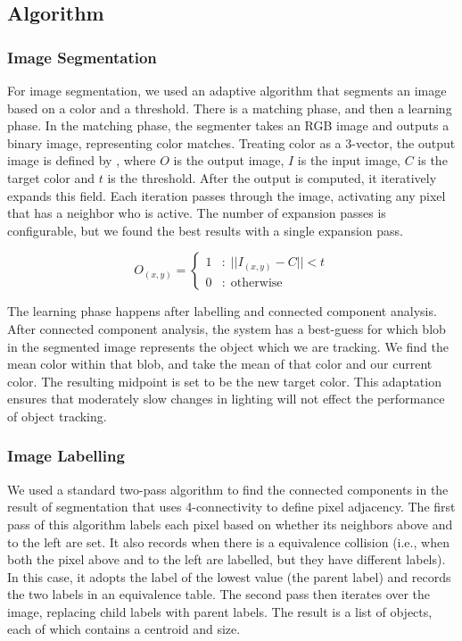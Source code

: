 
\subsection{Algorithm}
\subsubsection{Image Segmentation}
For image segmentation, we used an adaptive algorithm that segments an
image based on a color and a threshold. There is a matching phase, and
then a learning phase. In the matching phase, the segmenter takes an
RGB image and outputs a binary image, representing color
matches. Treating color as a 3-vector, the output image is defined by
, where $O$ is the output image, $I$ is the input
image, $C$ is the target color and $t$ is the threshold. After the
output is computed, it iteratively expands this field. Each iteration
passes through the image, activating any pixel that has a neighbor who
is active. The number of expansion passes is configurable, but we
found the best results with a single expansion pass.

\begin{equation}
  \label{eq:segment}
  O_{(x,y)} = \left\{ 
    \begin{array}{rl}
      1 &:\; || I_{(x,y)} - C || < t \\
      0 &:\; \mathrm{otherwise}
    \end{array} \right.
\end{equation}

The learning phase happens after labelling and connected component
analysis. After connected component analysis, the system has a
best-guess for which blob in the segmented image represents the object
which we are tracking. We find the mean color within that blob, and
take the mean of that color and our current color. The resulting
midpoint is set to be the new target color. This adaptation ensures
that moderately slow changes in lighting will not effect the
performance of object tracking.

\subsubsection{Image Labelling}
We used a standard two-pass algorithm to find the connected components
in the result of segmentation that uses 4-connectivity to define pixel
adjacency. The first pass of this algorithm labels each pixel based on
whether its neighbors above and to the left are set. It also records
when there is a equivalence collision (i.e., when both the pixel above
and to the left are labelled, but they have different labels). In this
case, it adopts the label of the lowest value (the parent label) and
records the two labels in an equivalence table. The second pass then
iterates over the image, replacing child labels with parent
labels. The result is a list of  objects, each of which
contains a centroid and size.

